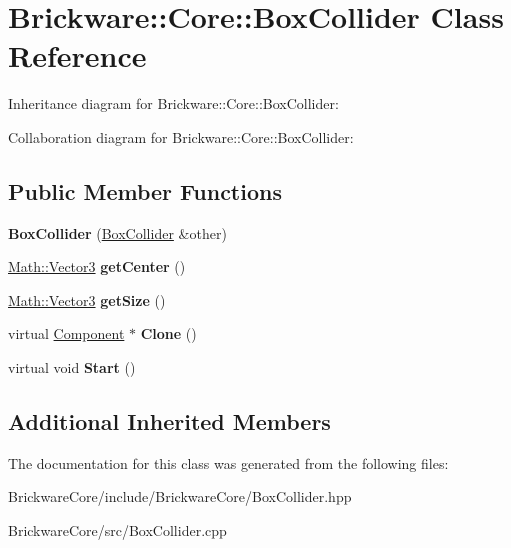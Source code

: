 \hypertarget{classBrickware_1_1Core_1_1BoxCollider}{}\section{Brickware\+:\+:Core\+:\+:Box\+Collider Class Reference}
\label{classBrickware_1_1Core_1_1BoxCollider}


Inheritance diagram for Brickware\+:\+:Core\+:\+:Box\+Collider\+:


Collaboration diagram for Brickware\+:\+:Core\+:\+:Box\+Collider\+:
\subsection*{Public Member Functions}
\begin{DoxyCompactItemize}
\item 
\hypertarget{classBrickware_1_1Core_1_1BoxCollider_a0ca4b422aa7712afe19288cc700609e9}{}{\bfseries Box\+Collider} (\hyperlink{classBrickware_1_1Core_1_1BoxCollider}{Box\+Collider} \&other)\label{classBrickware_1_1Core_1_1BoxCollider_a0ca4b422aa7712afe19288cc700609e9}

\item 
\hypertarget{classBrickware_1_1Core_1_1BoxCollider_a5adbcf47e57abd4b2107373310009e82}{}\hyperlink{classBrickware_1_1Math_1_1Vector3}{Math\+::\+Vector3} {\bfseries get\+Center} ()\label{classBrickware_1_1Core_1_1BoxCollider_a5adbcf47e57abd4b2107373310009e82}

\item 
\hypertarget{classBrickware_1_1Core_1_1BoxCollider_a2bc15d97853ae3c44f753837e7ca38fd}{}\hyperlink{classBrickware_1_1Math_1_1Vector3}{Math\+::\+Vector3} {\bfseries get\+Size} ()\label{classBrickware_1_1Core_1_1BoxCollider_a2bc15d97853ae3c44f753837e7ca38fd}

\item 
\hypertarget{classBrickware_1_1Core_1_1BoxCollider_a335e00788ef9ec5eb197fcd682e5ae17}{}virtual \hyperlink{classBrickware_1_1Core_1_1Component}{Component} $\ast$ {\bfseries Clone} ()\label{classBrickware_1_1Core_1_1BoxCollider_a335e00788ef9ec5eb197fcd682e5ae17}

\item 
\hypertarget{classBrickware_1_1Core_1_1BoxCollider_a37eb639a7e0c37a02fd96987e893268b}{}virtual void {\bfseries Start} ()\label{classBrickware_1_1Core_1_1BoxCollider_a37eb639a7e0c37a02fd96987e893268b}

\end{DoxyCompactItemize}
\subsection*{Additional Inherited Members}


The documentation for this class was generated from the following files\+:\begin{DoxyCompactItemize}
\item 
Brickware\+Core/include/\+Brickware\+Core/Box\+Collider.\+hpp\item 
Brickware\+Core/src/Box\+Collider.\+cpp\end{DoxyCompactItemize}
